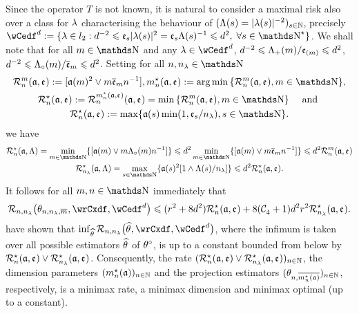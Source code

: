 \begin{rem*}
 Since the operator $T$ is not known, it is natural to
  consider a maximal risk also over a class for $\edf$ characterising the behaviour of
  $\Nsuite[s]{\iSv[s]= \vert \fedf[(s)] \vert ^{-2}}$, precisely $\rwCedf:=\{\edf\in\lp[2]:\edfCr^{-2}\leq\edfCw[s] \vert \fedf[(s)] \vert ^{2}=
\edfCw[s]\iSv[ s ]^{-1}\leq \edfCr^{2},\;\forall s\in\N^{\star}\}$.
We shall note that for all $\Di\in\N$ and any $\edf\in\rwCedf$,
$\edfCr^{-2}\leq\miSv/\edfCwm\leq \edfCr^{2}$,
$\edfCr^{-2}\leq\oiSv/\edfCwo\leq \edfCr^{2}$. Setting
for all $\ssY,\ssE\in\N$
\begin{multline}
 \dRa{\Di}{\xdfCw[],\edfCw[]}:=[\xdfCw^2\vee\Di\edfCwo \ssY^{-1}],
\hfill
\mnDi(\xdfCw[],\edfCw[]):=\argmin\Nset[{\Di\in\N}]{\dRa{\Di}{\xdfCw[],\edfCw[]}},\hfill\\\mnRa{\xdfCw[],\edfCw[]}:=\dRa{\mnDi({\xdfCw[],\edfCw[]})}{\xdfCw[],\edfCw[]}=\min\Nset[{\Di\in\N}]{\dRa{\Di}{\xdfCw[],\edfCw[]}}\quad\text{
  and }\\
\mnRa{\xdfCw[],\edfCw[]}:=\max\{\xdfCw[(s)]\min(1,\edfCw[s]/\ssE),s\in\N\}.
\end{multline}
we have 
\begin{multline}
 \mnRa{\xdfCw[],\Lambda}=\min_{\Di\in\N}\{[\xdfCw\vee\Di\oiSv\ssY^{-1}]\}\leq
 \edfCr^2\min_{\Di\in\N}\{[\xdfCw\vee\Di\edfCwo\ssY^{-1}]\}\leq \edfCr^2\dRa{\Di}{\xdfCw[],\edfCw[]}\\ 
  \mmRa{\xdfCw[],\Lambda}=\max_{s\in\N}\{\xdfCw[(s)]^2[1\wedge \iSv[s]/\ssE]\}\leq\edfCr^2\mnRa{\xdfCw[],\edfCw[]}.
\end{multline}
It follows for all $\Di,\ssY\in\N$ immediately that 
\begin{equation}
  \nmRi{\hxdfPr}{\rwCxdf,\rwCedf}
  \leq (\xdfCr^2+8\edfCr^2) \mnRa{\xdfCw[],\edfCw[]}
+8(\cst{4}+1)\edfCr^2\xdfCr^2\mmRa{\xdfCw[],\edfCw[]}.
\end{equation}
 have shown  that
  $\inf_{\hxdf}\nmRi{\hxdf}{\rwCxdf,\rwCedf}$, where the infimum is taken over all
  possible estimators $\hxdf$ of $\xdf$, is up to a constant bounded
  from below by $\mnRa{\xdfCw[],\edfCw[]}\vee\mmRa{\xdfCw[],\edfCw[]} $.  Consequently, the rate
  $\Nsuite[n]{\mnRa{\xdfCw[],\edfCw[]}\vee\mmRa{\xdfCw[],\edfCw[]}}$, the dimension parameters $\Nsuite[n]{\mnDi(\xdfCw[])}$
  and the projection estimators $\Nsuite[n]{\txdfPr[\mnDi({\xdfCw[]})]}$, respectively, is a
  minimax rate, a minimax dimension and minimax optimal (up to a
  constant).
\remEnd
\end{rem*}